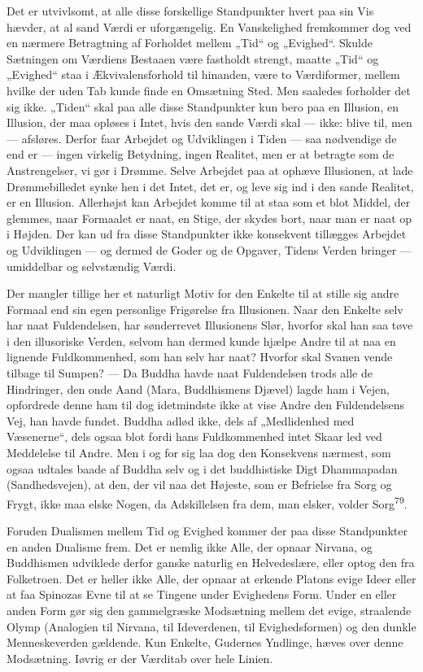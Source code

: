 \documentclass[12pt,a4paper,openany]{book}
\newcommand{\opage}[1]{\marginnote{\footnotesize\textit{[#1]}}}
\begin{document}
Det er utvivlsomt, at alle disse forskellige Standpunkter hvert paa sin
Vis hævder, at al sand Værdi er uforgængelig. En Vanskelighed fremkommer
dog ved en nærmere Betragtning af Forholdet mellem „Tid“ og „Evighed“.
Skulde Sætningen om Værdiens Bestaaen være fastholdt strengt, maatte
„Tid“ og „Evighed“ staa i Ækvivalensforhold til hinanden, være to
Værdiformer, mellem hvilke der uden Tab kunde finde en Omsætning Sted.
\opage{157}Men saaledes forholder det sig ikke. „Tiden“ skal paa alle
disse Standpunkter kun bero paa en Illusion, en Illusion, der maa
opløses i Intet, hvis den sande Værdi skal --- ikke: blive til, men ---
afsløres. Derfor faar Arbejdet og Udviklingen i Tiden --- saa nødvendige
de end er --- ingen virkelig Betydning, ingen Realitet, men er at
betragte som de Anstrengelser, vi gør i Drømme. Selve Arbejdet paa at
ophæve Illusionen, at lade Drømmebilledet synke hen i det Intet, det er,
og leve sig ind i den sande Realitet, er en Illusion. Allerhøjst kan
Arbejdet komme til at staa som et blot Middel, der glemmes, naar
Formaalet er naat, en Stige, der skydes bort, naar man er naat op i
Højden. Der kan ud fra disse Standpunkter ikke konsekvent tillægges
Arbejdet og Udviklingen --- og dermed de Goder og de Opgaver, Tidens
Verden bringer --- umiddelbar og selvstændig Værdi.

Der mangler tillige her et naturligt Motiv for den Enkelte til at stille
sig andre Formaal end sin egen personlige Frigørelse fra Illusionen.
Naar den Enkelte selv har naat Fuldendelsen, har sønderrevet Illusionens
Slør, hvorfor skal han saa tøve i den illusoriske Verden, selvom han
dermed kunde hjælpe Andre til at naa en lignende Fuldkommenhed, som han
selv har naat? Hvorfor skal Svanen vende tilbage til Sumpen? --- Da
Buddha havde naat Fuldendelsen trods alle de Hindringer, den onde Aand
(Mara, Buddhismens Djævel) lagde ham i Vejen, opfordrede denne ham til
dog idetmindste ikke at vise Andre den Fuldendelsens Vej, han havde
fundet. Buddha adlød ikke, dels af „Medlidenhed med Væsenerne“, dels
ogsaa blot fordi hans Fuldkommenhed intet Skaar led ved Meddelelse til
Andre. Men i og for sig laa dog den Konsekvens nærmest, som ogsaa
udtales baade af Buddha selv og i det buddhistiske Digt Dhammapadan
(Sandhedsvejen), at den, der vil naa det Højeste, som er Befrielse fra
Sorg og Frygt, ikke maa elske Nogen, da Adskillelsen fra dem, man
elsker, volder Sorg\textsuperscript{79}.

Foruden Dualismen mellem Tid og Evighed kommer der paa disse
Standpunkter en anden Dualisme frem. Det er nemlig ikke Alle, der opnaar
Nirvana, og Buddhismen udviklede derfor ganske naturlig en Helvedeslære,
eller optog den fra Folketroen. Det er heller ikke Alle, der opnaar at
erkende Platons evige Ideer eller at faa Spinozas Evne til at se Tingene
under Evighedens Form. Under en eller anden Form gør sig den
gammelgræske Modsætning mellem det evige, straalende Olymp (Analogien
til Nirvana, til Ideverdenen, til Evighedsformen) og
\opage{158}den dunkle Menneskeverden gældende. Kun Enkelte, Gudernes
Yndlinge, hæves over denne Modsætning. Iøvrig er der Værditab over hele
Linien.
\end{document}
